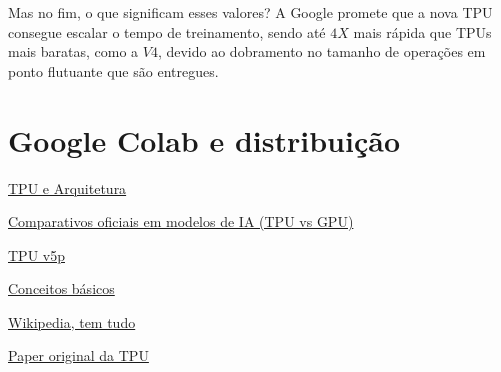 \documentclass{report}
\begin{document}
Mas no fim, o que significam esses valores? A Google promete que a nova TPU consegue escalar o tempo de treinamento, sendo até $4X$ mais rápida que TPUs mais baratas, como a $V4$, devido ao dobramento no tamanho de operações em ponto flutuante que são entregues.

\chapter{Google Colab e distribuição}




\href{https://www.run.ai/guides/cloud-deep-learning/google-tpu}{TPU e Arquitetura}

\href{https://cloud.google.com/blog/products/compute/performance-per-dollar-of-gpus-and-tpus-for-ai-inference}{Comparativos oficiais em modelos de IA (TPU vs GPU)}

\href{https://canaltech.com.br/inteligencia-artificial/cloud-tpu-v5p-e-o-novo-e-mais-poderoso-acelerador-de-ia-do-google-272299/}{TPU v5p}

\href{https://cloud.google.com/tpu?hl=pt-BR}{Conceitos básicos}

\href{https://en.wikipedia.org/wiki/Tensor_Processing_Unit}{Wikipedia, tem tudo}

\href{https://arxiv.org/pdf/1704.04760}{Paper original da TPU}
\end{document}
